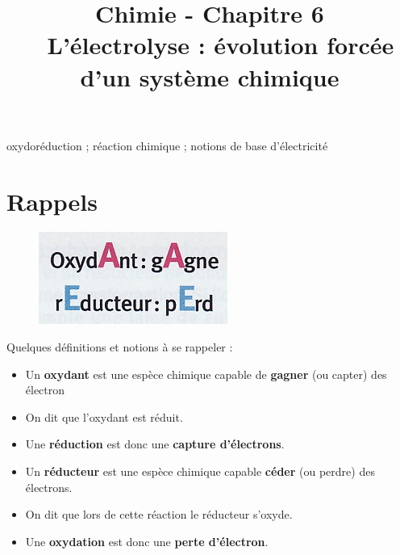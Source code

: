 \documentclass[11pt,a4paper]{article}
\title{\large Chimie - Chapitre 6 \\ \LARGE  L'électrolyse : évolution forcée d'un système chimique}
\date{}
\author{}
\begin{document}
\maketitle
\vspace{-1cm}
\begin{tcolorbox}[title=Notions de la classe de première à rappeler]
oxydoréduction ; réaction chimique ; notions de base d'électricité
\end{tcolorbox}
\tableofcontents


\section{Rappels}

\begin{figure}
\centering
\includegraphics[width=0.95\linewidth]{imgs/c6/mnemo.jpg}
\end{figure}

Quelques définitions et notions à se rappeler : 
\begin{itemize}
    \item Un \textbf{oxydant} est une espèce chimique capable de \textbf{gagner} (ou capter) des électron 
    \item On dit que l’oxydant est réduit.  
    \item Une \textbf{réduction} est donc une \textbf{capture d’électrons}.
    \item Un \textbf{réducteur} est une espèce chimique capable \textbf{céder} (ou perdre) des électrons.
    \item On dit que lors de cette réaction le réducteur s’oxyde.  
    \item Une \textbf{oxydation} est donc une \textbf{perte d’électron}. 
\end{itemize}
\end{document}
